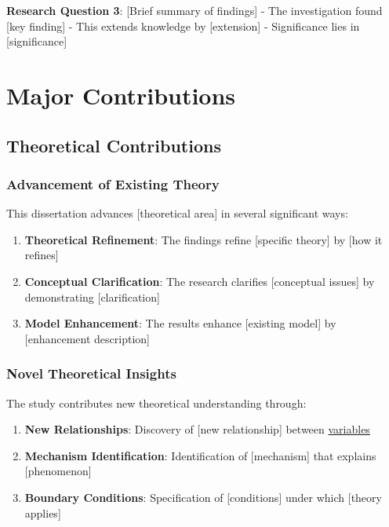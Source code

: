 \documentclass[
  12pt,
  letterpaper,
  12pt,
  letterpaper,
  oneside]{report}
\providecommand{\tightlist}{%
  \setlength{\itemsep}{0pt}\setlength{\parskip}{0pt}}
\begin{document}
\textbf{Research Question 3}: {[}Brief summary of findings{]} - The
investigation found {[}key finding{]} - This extends knowledge by
{[}extension{]} - Significance lies in {[}significance{]}

\section{Major Contributions}\label{major-contributions}

\subsection{Theoretical
Contributions}\label{theoretical-contributions-1}

\subsubsection{Advancement of Existing
Theory}\label{advancement-of-existing-theory}

This dissertation advances {[}theoretical area{]} in several significant
ways:

\begin{enumerate}
\def\labelenumi{\arabic{enumi}.}
\tightlist
\item
  \textbf{Theoretical Refinement}: The findings refine {[}specific
  theory{]} by {[}how it refines{]}
\item
  \textbf{Conceptual Clarification}: The research clarifies
  {[}conceptual issues{]} by demonstrating {[}clarification{]}
\item
  \textbf{Model Enhancement}: The results enhance {[}existing model{]}
  by {[}enhancement description{]}
\end{enumerate}

\subsubsection{Novel Theoretical
Insights}\label{novel-theoretical-insights}

The study contributes new theoretical understanding through:

\begin{enumerate}
\def\labelenumi{\arabic{enumi}.}
\tightlist
\item
  \textbf{New Relationships}: Discovery of {[}new relationship{]}
  between \hyperref[variables]{variables}
\item
  \textbf{Mechanism Identification}: Identification of {[}mechanism{]}
  that explains {[}phenomenon{]}
\item
  \textbf{Boundary Conditions}: Specification of {[}conditions{]} under
  which {[}theory applies{]}
\end{enumerate}
\end{document}
